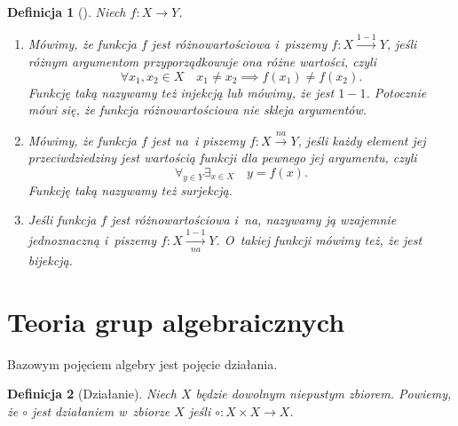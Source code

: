 \documentclass[12pt,a4paper]{report}
\newtheorem{definition}{Definicja}[chapter]
\begin{document}
\begin{definition}[{\citep[Sec 5.2 Def. 5.5]{kraszewski2007wstkep}}]
Niech $f:X \to Y$.
\begin{enumerate}
\item
Mówimy, że funkcja $f$ jest różnowartościowa i~piszemy $f:X\xrightarrow{1-1} Y$, jeśli różnym argumentom przyporządkowuje ona różne wartości, czyli
\begin{equation*}
\forall{x_{1},x_{2}}\in X \quad x_{1}\ne x_{2} \implies f(x_{1})\ne f(x_{2}).
\end{equation*}
Funkcję taką nazywamy też injekcją lub mówimy, że jest $1-1$. Potocznie mówi się, że funkcja różnowartościowa nie skleja argumentów.
\item
Mówimy, że funkcja $f$ jest na~i piszemy $f:X\xrightarrow{na}Y$, jeśli każdy element jej przeciwdziedziny jest wartością funkcji dla pewnego jej argumentu, czyli
\begin{equation*}
\forall_{y\in Y} \exists_{x\in X} \quad y=f(x).
\end{equation*}
Funkcję taką nazywamy też surjekcją.
\item
Jeśli funkcja $f$ jest różnowartościowa i~na, nazywamy ją wzajemnie jednoznaczną i~piszemy $f:X\xrightarrow[na]{1-1} Y$. O~takiej funkcji mówimy też, że jest bijekcją.
\end{enumerate}
\end{definition}


\section{Teoria grup algebraicznych}

Bazowym pojęciem algebry jest pojęcie działania.

\begin{definition}[Działanie{\citep[Sec 4.1]{jedrzejewski2011algebra}}]
Niech $X$ będzie dowolnym niepustym zbiorem. Powiemy, że $\circ$ jest działaniem w~zbiorze $X$ jeśli $\circ: X \times X \to X$.
\end{definition}
\end{document}
